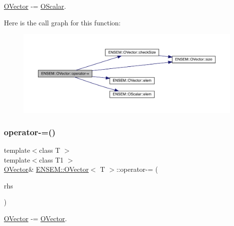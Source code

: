 \mbox{\hyperlink{classENSEM_1_1OVector}{O\+Vector}} -\/= \mbox{\hyperlink{classENSEM_1_1OScalar}{O\+Scalar}}. 

Here is the call graph for this function\+:
\nopagebreak
\begin{figure}[H]
\begin{center}
\leavevmode
\includegraphics[width=350pt]{d0/d8d/classENSEM_1_1OVector_ae2ae62360c5eb29827cb7e3d5556859f_cgraph}
\end{center}
\end{figure}
\mbox{\label{classENSEM_1_1OVector_ae8a6c2f30368c6713325d05065aec425}} 
\subsubsection{\texorpdfstring{operator-\/=()}{operator-=()}\hspace{0.1cm}{\footnotesize\ttfamily [3/4]}}
{\footnotesize\ttfamily template$<$class T $>$ \\
template$<$class T1 $>$ \\
\mbox{\hyperlink{classENSEM_1_1OVector}{O\+Vector}}\& \mbox{\hyperlink{classENSEM_1_1OVector}{E\+N\+S\+E\+M\+::\+O\+Vector}}$<$ T $>$\+::operator-\/= (\begin{DoxyParamCaption}\item[{const \mbox{\hyperlink{classENSEM_1_1OVector}{O\+Vector}}$<$ T1 $>$ \&}]{rhs }\end{DoxyParamCaption})\hspace{0.3cm}{\ttfamily [inline]}}



\mbox{\hyperlink{classENSEM_1_1OVector}{O\+Vector}} -\/= \mbox{\hyperlink{classENSEM_1_1OVector}{O\+Vector}}. 

